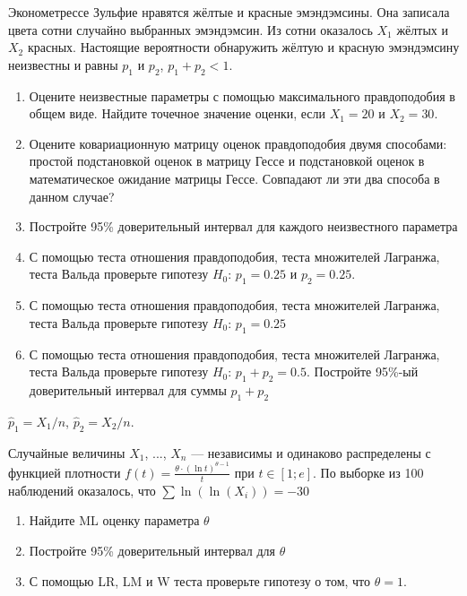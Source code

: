 \documentclass[pdftex,11pt,openany]{book}\usepackage[]{graphicx}\usepackage[]{color}
\begin{document}
\begin{problem}
\useR Эконометрессе Зульфие нравятся жёлтые и красные эмэндэмсины. Она записала цвета сотни случайно выбранных эмэндэмсин. Из сотни оказалось $X_1$ жёлтых и $X_2$ красных. Настоящие вероятности обнаружить жёлтую и красную эмэндэмсину неизвестны и равны $p_1$ и $p_2$, $p_1+p_2<1$.

\begin{enumerate}
\item Оцените неизвестные параметры с помощью максимального правдоподобия в общем виде. Найдите точечное значение оценки, если $X_1=20$ и $X_2=30$.
\item Оцените ковариационную матрицу оценок правдоподобия двумя способами: простой подстановкой оценок в матрицу Гессе и подстановкой оценок в математическое ожидание матрицы Гессе. Совпадают ли эти два способа в данном случае?
\item Постройте 95\% доверительный интервал для каждого неизвестного параметра
\item С помощью теста отношения правдоподобия, теста множителей Лагранжа, теста Вальда проверьте гипотезу $H_0$: $p_1=0.25$ и $p_2=0.25$.
\item С помощью теста отношения правдоподобия, теста множителей Лагранжа, теста Вальда проверьте гипотезу $H_0$: $p_1=0.25$
\item С помощью теста отношения правдоподобия, теста множителей Лагранжа, теста Вальда проверьте гипотезу $H_0$: $p_1+p_2=0.5$. Постройте 95\%-ый доверительный интервал для суммы $p_1+p_2$
\end{enumerate}

\end{problem}

\begin{solution}
$\hat{p}_1=X_1/n$, $\hat{p}_2=X_2/n$.
\end{solution}


\begin{problem}
Случайные величины $X_{1}$, ..., $X_{n}$ --- независимы и одинаково распределены с функцией плотности $f(t)=\frac{\theta \cdot\left(\ln  t\right)^{\theta -1}}{t} $  при  $t\in
\left[1;e\right]$. По выборке из 100 наблюдений оказалось, что $\sum{\ln(\ln(X_{i}))}=-30$
\begin{enumerate}
\item Найдите ML оценку параметра $\theta$
\item Постройте 95\% доверительный интервал для $\theta$
\item С помощью LR, LM и W теста проверьте гипотезу о том, что $\theta=1$.
\end{enumerate}
\end{problem}
\end{document}
